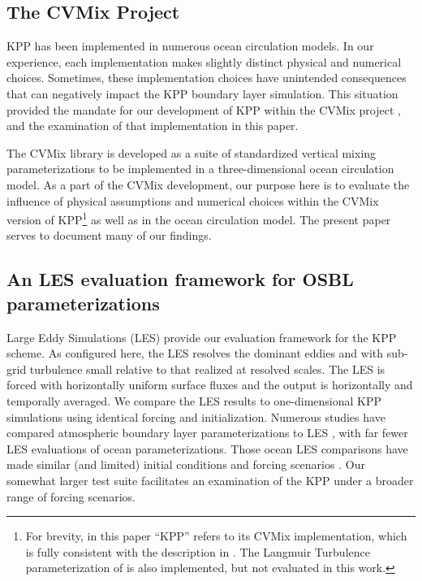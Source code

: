 \documentclass[preprint,12pt,authoryear]{agujournal}
\begin{document}
\subsection{The CVMix Project}

KPP has been implemented in numerous ocean circulation models. In our experience, each implementation makes slightly distinct physical and numerical choices. Sometimes, these implementation choices have unintended consequences that can negatively impact the KPP boundary layer simulation.  This situation provided the mandate for our development of KPP within the CVMix project \citep{Griffies2015}, and the examination of that implementation in this paper. 

The CVMix library is developed as a suite of standardized vertical mixing parameterizations to be implemented in a three-dimensional ocean circulation model.  As a part of the CVMix development, our purpose here is to evaluate the influence of physical assumptions and numerical choices within the CVMix version of KPP\footnote{For brevity, in this paper ``KPP'' refers to its CVMix implementation, which is fully consistent with the description in \cite{Danabasoglu2006}. The Langmuir Turbulence parameterization of \cite{Li:2015gv} is also implemented, but not evaluated in this work.} as well as in the ocean circulation model.  The present paper serves to document many of our findings.  

\subsection{An LES evaluation framework for OSBL parameterizations}

Large Eddy Simulations (LES) provide our evaluation framework for the KPP scheme. As configured here, the LES resolves the dominant eddies and with sub-grid turbulence small relative to that realized at resolved scales. The LES is forced with horizontally uniform surface fluxes and the output is horizontally and temporally averaged. We compare the LES results to one-dimensional KPP simulations using identical forcing and initialization. Numerous studies have compared atmospheric boundary layer parameterizations to LES \citep[\textit{e.g.},][]{Holtslag1991,Moeng1994,Brown1996,Ayotte1996,Noh2003}, with far fewer LES evaluations of ocean parameterizations.  Those ocean LES comparisons have made similar (and limited) initial conditions and forcing scenarios \citep[\textit{e.g.},][]{McWilliams2000,Smyth2002,Reichl:2016db,bachman2017parameterization}. Our somewhat larger test suite facilitates an examination of the KPP under a broader range of forcing scenarios. 
\end{document}
